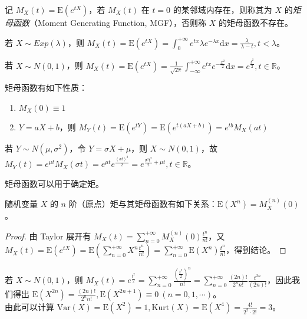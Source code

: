 \documentclass[../main.tex]{subfiles}
\begin{document}
\begin{definition}\label{def:4.6.1}
    记 $M_X(t)=\mathrm E(e^{tX})$，若 $M_X(t)$ 在 $t=0$ 的某邻域内存在，则称其为 $X$ 的\emph{矩母函数}（Moment Generating Function, MGF），否则称 $X$ 的矩母函数不存在。
\end{definition}

\begin{example}
    若 $X\sim Exp(\lambda)$，则 $M_X(t)=\mathrm E(e^{tX})=\int_0^{+\infty}e^{tx}\lambda e^{-\lambda x}\mathrm dx=\frac\lambda{\lambda-t},t<\lambda$。
\end{example}

\begin{example}
    若 $X\sim N(0,1)$，则 $M_X(t)=\mathrm E(e^{tX})=\frac{1}{\sqrt{2\pi}}\int_{-\infty}^{+\infty}e^{tx}e^{-\frac{x^2}2}\mathrm dx=e^{\frac{t^2}2},t\in\mathbb R$。
\end{example}

\begin{proposition}
    矩母函数有如下性质：
    \begin{enumerate}
        \item $M_X(0)\equiv1$
        \item $Y=aX+b$，则 $M_Y(t)=\mathrm E(e^{tY})=\mathrm E(e^{t(aX+b)})=e^{tb}M_X(at)$
    \end{enumerate}
\end{proposition}

\begin{example}
    若 $Y\sim N(\mu,\sigma^2)$，令 $Y=\sigma X+\mu$，则 $X\sim N(0,1)$，故 $M_Y(t)=e^{\mu t}M_X(\sigma t)=e^{\mu t}e^{\frac{(\sigma t)^2}2}=e^{\frac{\sigma^2t^2}2+\mu t},t\in\mathbb R$。
\end{example}

矩母函数可以用于确定矩。

\begin{theorem}\label{thm:4.6.1}
    随机变量 $X$ 的 $n$ 阶（原点）矩与其矩母函数有如下关系：$\mathrm E(X^n)=M_X^{(n)}(0)$。
\end{theorem}

\begin{proof}
    由 Taylor 展开有 $M_X(t)=\sum_{n=0}^{+\infty}M_X^{(n)}(0)\frac{t^n}{n!}$，又 $M_X(t)=\mathrm E(e^{tX})=\mathrm E(\sum_{n=0}^{+\infty}X^n\frac{t^n}{n!})=\sum_{n=0}^{+\infty}\mathrm E(X^n)\frac{t^n}{n!}$，得到结论。
\end{proof}

\begin{example}
    若 $X\sim N(0,1)$，则 $M_X(t)=e^{\frac{t^2}2}=\sum_{n=0}^{+\infty}\frac{(\frac{t^2}2)^n}{n!}=\sum_{n=0}^{+\infty}\frac{(2n)!}{2^nn!}\frac{t^{2n}}{(2n)!}$，因此我们得出 $\mathrm E(X^{2n})=\frac{(2n)!}{2^nn!},\mathrm E(X^{2n+1})\equiv0\ (n=0,1,\cdots)$。\\
    由此可以计算 $\mathrm{Var}(X)=\mathrm E(X^2)=1,\mathrm{Kurt}(X)=\mathrm E(X^4)=\frac{4!}{2^2\cdot2!}=3$。
\end{example}
\end{document}

